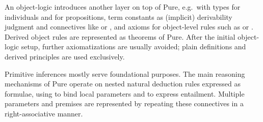 \begin{isabellebody}
\begin{isamarkuptext}
  \medskip An object-logic introduces another layer on top of Pure,
  e.g.\ with types  for individuals and  for
  propositions, term constants  as
  (implicit) derivability judgment and connectives like  or , and axioms for object-level
  rules such as  or .  Derived object rules are represented as theorems of
  Pure.  After the initial object-logic setup, further axiomatizations
  are usually avoided; plain definitions and derived principles are
  used exclusively.%
\end{isamarkuptext}%
\isamarkuptrue%
%
\isamarkuptrue%
%
\begin{isamarkuptext}%
Primitive inferences mostly serve foundational purposes.  The main
  reasoning mechanisms of Pure operate on nested natural deduction
  rules expressed as formulae, using \isa{{\isachardoublequote}{\isasymAnd}{\isachardoublequote}} to bind local
  parameters and \isa{{\isachardoublequote}{\isasymLongrightarrow}{\isachardoublequote}} to express entailment.  Multiple
  parameters and premises are represented by repeating these
  connectives in a right-associative manner.


\end{isamarkuptext}
\end{isabellebody}
